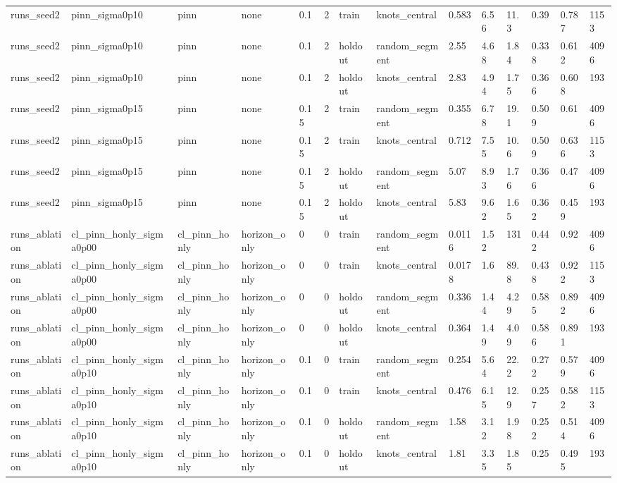\begin{table}[t]
\begin{tabular}{llllllllllllll}
runs\_seed2 & pinn\_sigma0p10 & pinn & none & 0.1 & 2 & train & knots\_central & 0.583 & 6.56 & 11.3 & 0.39 & 0.787 & 1153 \\
runs\_seed2 & pinn\_sigma0p10 & pinn & none & 0.1 & 2 & holdout & random\_segment & 2.55 & 4.68 & 1.84 & 0.338 & 0.612 & 4096 \\
runs\_seed2 & pinn\_sigma0p10 & pinn & none & 0.1 & 2 & holdout & knots\_central & 2.83 & 4.94 & 1.75 & 0.366 & 0.608 & 193 \\
runs\_seed2 & pinn\_sigma0p15 & pinn & none & 0.15 & 2 & train & random\_segment & 0.355 & 6.78 & 19.1 & 0.509 & 0.61 & 4096 \\
runs\_seed2 & pinn\_sigma0p15 & pinn & none & 0.15 & 2 & train & knots\_central & 0.712 & 7.55 & 10.6 & 0.509 & 0.636 & 1153 \\
runs\_seed2 & pinn\_sigma0p15 & pinn & none & 0.15 & 2 & holdout & random\_segment & 5.07 & 8.93 & 1.76 & 0.366 & 0.47 & 4096 \\
runs\_seed2 & pinn\_sigma0p15 & pinn & none & 0.15 & 2 & holdout & knots\_central & 5.83 & 9.62 & 1.65 & 0.362 & 0.459 & 193 \\
runs\_ablation & cl\_pinn\_honly\_sigma0p00 & cl\_pinn\_honly & horizon\_only & 0 & 0 & train & random\_segment & 0.0116 & 1.52 & 131 & 0.442 & 0.92 & 4096 \\
runs\_ablation & cl\_pinn\_honly\_sigma0p00 & cl\_pinn\_honly & horizon\_only & 0 & 0 & train & knots\_central & 0.0178 & 1.6 & 89.8 & 0.438 & 0.922 & 1153 \\
runs\_ablation & cl\_pinn\_honly\_sigma0p00 & cl\_pinn\_honly & horizon\_only & 0 & 0 & holdout & random\_segment & 0.336 & 1.44 & 4.29 & 0.585 & 0.892 & 4096 \\
runs\_ablation & cl\_pinn\_honly\_sigma0p00 & cl\_pinn\_honly & horizon\_only & 0 & 0 & holdout & knots\_central & 0.364 & 1.49 & 4.09 & 0.586 & 0.891 & 193 \\
runs\_ablation & cl\_pinn\_honly\_sigma0p10 & cl\_pinn\_honly & horizon\_only & 0.1 & 0 & train & random\_segment & 0.254 & 5.64 & 22.2 & 0.272 & 0.579 & 4096 \\
runs\_ablation & cl\_pinn\_honly\_sigma0p10 & cl\_pinn\_honly & horizon\_only & 0.1 & 0 & train & knots\_central & 0.476 & 6.15 & 12.9 & 0.257 & 0.582 & 1153 \\
runs\_ablation & cl\_pinn\_honly\_sigma0p10 & cl\_pinn\_honly & horizon\_only & 0.1 & 0 & holdout & random\_segment & 1.58 & 3.12 & 1.98 & 0.252 & 0.514 & 4096 \\
runs\_ablation & cl\_pinn\_honly\_sigma0p10 & cl\_pinn\_honly & horizon\_only & 0.1 & 0 & holdout & knots\_central & 1.81 & 3.35 & 1.85 & 0.25 & 0.495 & 193 \\

\end{tabular}
\end{table}
